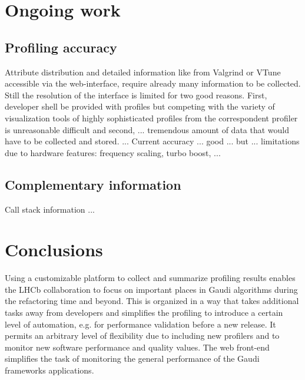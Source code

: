 \documentclass[a4paper]{jpconf}
\begin{document}
\section{Ongoing work}
\label{sec:ongoing_work}

\subsection{Profiling accuracy}
\label{sec:profiling accuracy}

Attribute distribution and detailed information like from Valgrind or VTune accessible via the web-interface, require already many information to be collected. Still the resolution of the interface is limited for two good reasons. First, developer shell be provided with profiles but competing with the variety of visualization tools of highly sophisticated profiles from the correspondent profiler is unreasonable difficult and second, ... tremendous amount of data that would have to be collected and stored. ... Current accuracy ... good ... but ... limitations due to hardware features: frequency scaling, turbo boost, ...

\subsection{Complementary information}
\label{sec:complementary_information}

Call stack information ...

\section{Conclusions}
\label{sec:conclusions}

Using a customizable platform to collect and summarize profiling results enables the LHCb collaboration to focus on important places in Gaudi algorithms during the refactoring time and beyond. This is organized in a way that takes additional tasks away from developers and simplifies the profiling to introduce a certain level of automation, e.g. for performance validation before a new release. It permits an arbitrary level of flexibility due to including new profilers and to monitor new software performance and quality values. The web front-end simplifies the task of monitoring the general performance of the Gaudi frameworks applications. 
\end{document}
